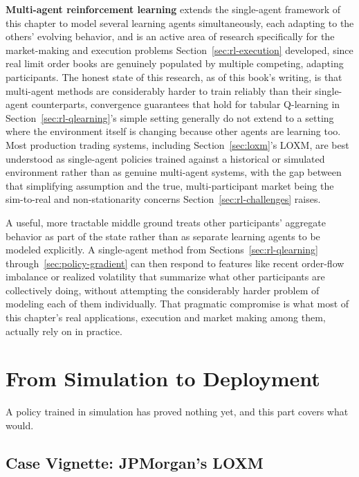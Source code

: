 \documentclass[../ai_in_finance]{subfiles}
\begin{document}
\textbf{Multi-agent reinforcement learning} extends the single-agent framework of this chapter to model several learning agents simultaneously, each adapting to the others' evolving behavior, and is an active area of research specifically for the market-making and execution problems Section~\ref{sec:rl-execution} developed, since real limit order books are genuinely populated by multiple competing, adapting participants. The honest state of this research, as of this book's writing, is that multi-agent methods are considerably harder to train reliably than their single-agent counterparts, convergence guarantees that hold for tabular Q-learning in Section~\ref{sec:rl-qlearning}'s simple setting generally do not extend to a setting where the environment itself is changing because other agents are learning too. Most production trading systems, including Section~\ref{sec:loxm}'s LOXM, are best understood as single-agent policies trained against a historical or simulated environment rather than as genuine multi-agent systems, with the gap between that simplifying assumption and the true, multi-participant market being the sim-to-real and non-stationarity concerns Section~\ref{sec:rl-challenges} raises.

A useful, more tractable middle ground treats other participants' aggregate behavior as part of the state rather than as separate learning agents to be modeled explicitly. A single-agent method from Sections~\ref{sec:rl-qlearning} through~\ref{sec:policy-gradient} can then respond to features like recent order-flow imbalance or realized volatility that summarize what other participants are collectively doing, without attempting the considerably harder problem of modeling each of them individually. That pragmatic compromise is what most of this chapter's real applications, execution and market making among them, actually rely on in practice.

\section{From Simulation to Deployment}

A policy trained in simulation has proved nothing yet, and this part covers what would.

\subsection{Case Vignette: JPMorgan's LOXM}
\label{sec:loxm}
\end{document}
